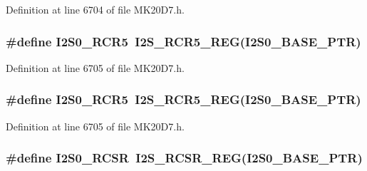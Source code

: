 Definition at line 6704 of file M\+K20\+D7.\+h.

\subsubsection[{\texorpdfstring{I2\+S0\+\_\+\+R\+C\+R5}{I2S0_RCR5}}]{\setlength{\rightskip}{0pt plus 5cm}\#define I2\+S0\+\_\+\+R\+C\+R5~{\bf I2\+S\+\_\+\+R\+C\+R5\+\_\+\+R\+EG}({\bf I2\+S0\+\_\+\+B\+A\+S\+E\+\_\+\+P\+TR})}\hypertarget{group___i2_s___register___accessor___macros_ga6658de1dbfbefc9f553627ac3fe220d2}{}\label{group___i2_s___register___accessor___macros_ga6658de1dbfbefc9f553627ac3fe220d2}


Definition at line 6705 of file M\+K20\+D7.\+h.

\subsubsection[{\texorpdfstring{I2\+S0\+\_\+\+R\+C\+R5}{I2S0_RCR5}}]{\setlength{\rightskip}{0pt plus 5cm}\#define I2\+S0\+\_\+\+R\+C\+R5~{\bf I2\+S\+\_\+\+R\+C\+R5\+\_\+\+R\+EG}({\bf I2\+S0\+\_\+\+B\+A\+S\+E\+\_\+\+P\+TR})}\hypertarget{group___i2_s___register___accessor___macros_ga6658de1dbfbefc9f553627ac3fe220d2}{}\label{group___i2_s___register___accessor___macros_ga6658de1dbfbefc9f553627ac3fe220d2}


Definition at line 6705 of file M\+K20\+D7.\+h.

\subsubsection[{\texorpdfstring{I2\+S0\+\_\+\+R\+C\+SR}{I2S0_RCSR}}]{\setlength{\rightskip}{0pt plus 5cm}\#define I2\+S0\+\_\+\+R\+C\+SR~{\bf I2\+S\+\_\+\+R\+C\+S\+R\+\_\+\+R\+EG}({\bf I2\+S0\+\_\+\+B\+A\+S\+E\+\_\+\+P\+TR})}\hypertarget{group___i2_s___register___accessor___macros_ga1a4cf64f967438af2da04d536cee179b}{}\label{group___i2_s___register___accessor___macros_ga1a4cf64f967438af2da04d536cee179b}


